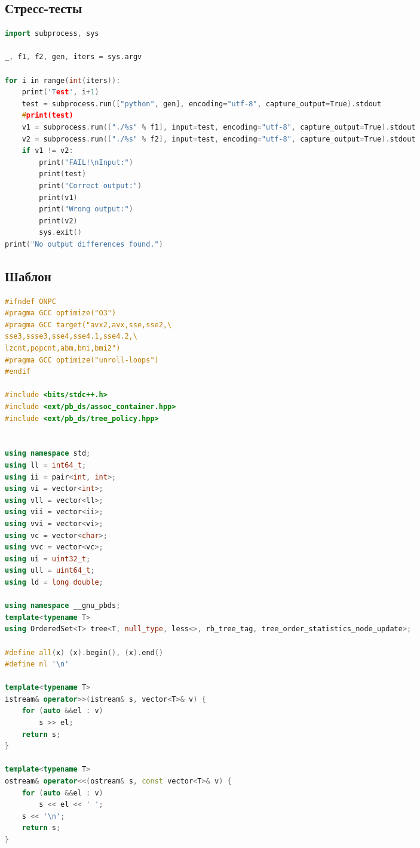 \documentclass[10pt,a4paper,landscape,twosided]{extarticle}
\begin{document}
\begin{multicols}{3}
\subsection{Стресс-тесты}
\begin{lstlisting}[language=C++]
import subprocess, sys

_, f1, f2, gen, iters = sys.argv

for i in range(int(iters)):
    print('Test', i+1)
    test = subprocess.run(["python", gen], encoding="utf-8", capture_output=True).stdout
    #print(test)
    v1 = subprocess.run(["./%s" % f1], input=test, encoding="utf-8", capture_output=True).stdout
    v2 = subprocess.run(["./%s" % f2], input=test, encoding="utf-8", capture_output=True).stdout
    if v1 != v2:
        print("FAIL!\nInput:")
        print(test)
        print("Correct output:")
        print(v1)
        print("Wrong output:")
        print(v2)
        sys.exit()
print("No output differences found.")
\end{lstlisting}

\subsection{Шаблон}
\begin{lstlisting}[language=C++]
#ifndef ONPC
#pragma GCC optimize("O3")
#pragma GCC target("avx2,avx,sse,sse2,\
sse3,ssse3,sse4,sse4.1,sse4.2,\
lzcnt,popcnt,abm,bmi,bmi2")
#pragma GCC optimize("unroll-loops")
#endif

#include <bits/stdc++.h>
#include <ext/pb_ds/assoc_container.hpp>
#include <ext/pb_ds/tree_policy.hpp>


using namespace std;
using ll = int64_t;
using ii = pair<int, int>;
using vi = vector<int>;
using vll = vector<ll>;
using vii = vector<ii>;
using vvi = vector<vi>;
using vc = vector<char>;
using vvc = vector<vc>;
using ui = uint32_t;
using ull = uint64_t;
using ld = long double;

using namespace __gnu_pbds;
template<typename T>
using OrderedSet<T> tree<T, null_type, less<>, rb_tree_tag, tree_order_statistics_node_update>;

#define all(x) (x).begin(), (x).end()
#define nl '\n'

template<typename T>
istream& operator>>(istream& s, vector<T>& v) {
    for (auto &&el : v)
        s >> el;
    return s;
}

template<typename T>
ostream& operator<<(ostream& s, const vector<T>& v) {
    for (auto &&el : v)
        s << el << ' ';
    s << '\n';
    return s;
}


\end{lstlisting}
\end{multicols}
\end{document}
